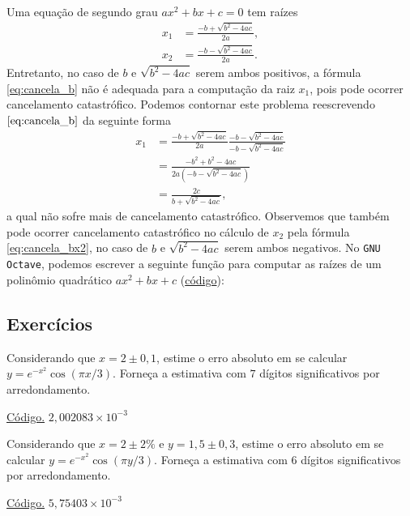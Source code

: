 \begin{ex}\label{ex:solpq}
  Uma equação de segundo grau $ax^2 + bx + c = 0$ tem raízes
  \begin{align}
    x_1 &= \frac{-b + \sqrt{b^2 - 4ac}}{2a},\label{eq:cancela_b}\\
    x_2 &= \frac{-b - \sqrt{b^2 - 4ac}}{2a}.\label{eq:cancela_bx2}
  \end{align}
Entretanto, no caso de $b$ e $\sqrt{b^2 - 4ac}$ serem ambos positivos, a fórmula \eqref{eq:cancela_b} não é adequada para a computação da raiz $x_1$, pois pode ocorrer cancelamento catastrófico. Podemos contornar este problema reescrevendo $\eqref{eq:cancela_b}$ da seguinte forma
\begin{align}
  x_1 &= \frac{-b + \sqrt{b^2 - 4ac}}{2a}\frac{-b - \sqrt{b^2 - 4ac}}{-b - \sqrt{b^2 - 4ac}}\\
  &= \frac{-b^2 + b^2 - 4ac}{2a(-b-\sqrt{b^2-4ac})}\\
  &= \frac{2c}{b+\sqrt{b^2-4ac}},
\end{align}
a qual não sofre mais de cancelamento catastrófico. Observemos que também pode ocorrer cancelamento catastrófico no cálculo de $x_2$ pela fórmula \eqref{eq:cancela_bx2}, no caso de $b$ e $\sqrt{b^2 - 4ac}$ serem ambos negativos.
\ifisoctave
No \verb+GNU Octave+, podemos escrever a seguinte função para computar as raízes de um polinômio quadrático $ax^2 + bx + c$ (\href{https://github.com/phkonzen/notas/blob/master/src/MatematicaNumerica/cap_aritm/dados/ex_solpq/ex_solpq.m}{código}):

\fi
\end{ex}

\subsection*{Exercícios}

\begin{exer}\label{exer:properro_abs1}
  Considerando que $x=2\pm 0,1$, estime o erro absoluto em se calcular $y = e^{-x^2}\cos(\pi x/3)$. Forneça a estimativa com $7$ dígitos significativos por arredondamento.
\end{exer}
\begin{resp}
  \ifisoctave 
  \href{https://github.com/phkonzen/notas/blob/master/src/MatematicaNumerica/cap_aritm/dados/exer_properro_abs1/exer_properro_abs1.m}{Código.} 
  \fi
  $2,002083\times 10^{-3}$
\end{resp}

\begin{exer}\label{exer:properro_abs2}
  Considerando que $x=2\pm 2\%$ e $y=1,5\pm 0,3$, estime o erro absoluto em se calcular $y = e^{-x^2}\cos(\pi y/3)$. Forneça a estimativa com $6$ dígitos significativos por arredondamento.
\end{exer}
\begin{resp}
  \ifisoctave 
  \href{https://github.com/phkonzen/notas/blob/master/src/MatematicaNumerica/cap_aritm/dados/exer_properro_abs2/exer_properro_abs2.m}{Código.} 
  \fi
  $5,75403\times 10^{-3}$
\end{resp}


